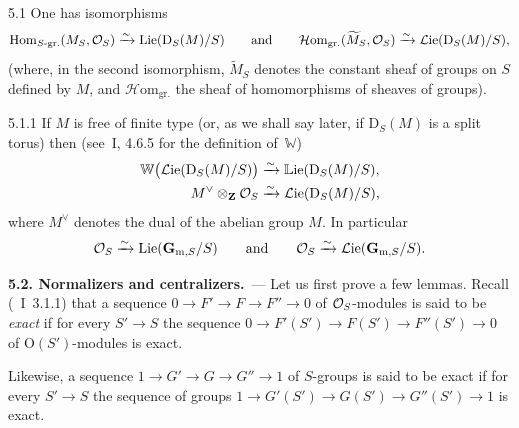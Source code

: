 \begin{proposition}{5.1}
\label{II.5.1}
One has isomorphisms
\[
\operatorname{Hom}_{S\text{-gr.}}(M_S,\mathcal{O}_S)\xrightarrow{\sim}\operatorname{Lie}(\mathrm{D}_S(M)/S)
\qquad\text{and}\qquad
\mathcal{H}\mathrm{om}_{\mathrm{gr.}}(\widetilde{M}_S,\mathcal{O}_S)
\xrightarrow{\sim}\mathcal{L}\mathrm{ie}(\mathrm{D}_S(M)/S),
\]
(where, in the second isomorphism, \(\widetilde{M}_S\) denotes the constant
sheaf of groups on \(S\) defined by \(M\), and
\(\mathcal{H}\mathrm{om}_{\mathrm{gr.}}\) the sheaf of homomorphisms of
sheaves of groups).
\end{proposition}

\begin{corollary}{5.1.1}
\label{II.5.1.1}
If \(M\) is free of finite type (or, as we shall say later, if
\(\mathrm{D}_S(M)\) is a split torus) then (see~I, 4.6.5 for the definition
of~\(\mathbb{W}\))
\begin{align*}
\mathbb{W}\bigl(\mathcal{L}\mathrm{ie}(\mathrm{D}_S(M)/S)\bigr)
&\xrightarrow{\sim}\mathbb{L}\mathrm{ie}(\mathrm{D}_S(M)/S),\\
M^{\vee}\otimes_{\mathbf{Z}}\mathcal{O}_S
&\xrightarrow{\sim}\mathcal{L}\mathrm{ie}(\mathrm{D}_S(M)/S),
\end{align*}
where \(M^{\vee}\) denotes the dual of the abelian group \(M\). In particular
\[
\mathcal{O}_S\xrightarrow{\sim}\operatorname{Lie}(\mathbf{G}_{\mathrm{m},S}/S)
\qquad\text{and}\qquad
\mathcal{O}_S\xrightarrow{\sim}\mathcal{L}\mathrm{ie}(\mathbf{G}_{\mathrm{m},S}/S).
\]
\end{corollary}

\par{}%
\noindent\textbf{5.2. Normalizers and centralizers.}\ ---
\label{II.5.2}
Let us first prove a few lemmas.
Recall (\cf~I~3.1.1) that a sequence \(0\to F'\to F\to F''\to 0\) of
\(\mathcal{O}_S\)-modules is said to be \emph{exact} if for every \(S'\to S\) the
sequence \(0\to F'(S')\to F(S')\to F''(S')\to 0\) of
\(\mathrm{O}(S')\)-modules is exact.

Likewise, a sequence \(1\to G'\to G\to G''\to 1\) of \(S\)-groups is said to
be exact if for every \(S'\to S\) the sequence of groups
\(1\to G'(S')\to G(S')\to G''(S')\to 1\) is exact.

